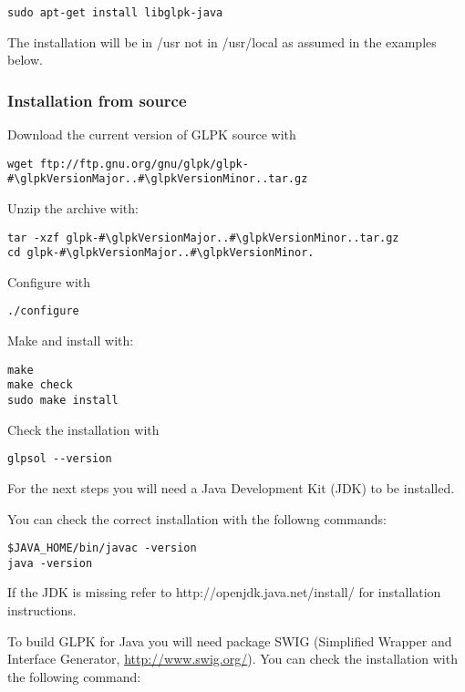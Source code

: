 \documentclass[a4paper,11pt]{report}
\newcommand{\glpkVersionMajor}{4}
\newcommand{\glpkVersionMinor}{55}
\begin{document}
\begin{lstlisting}
sudo apt-get install libglpk-java
\end{lstlisting}

The installation will be in /usr not in /usr/local as assumed in the examples below.

\subsubsection{Installation from source}

Download the current version of GLPK source with

\begin{lstlisting}
wget ftp://ftp.gnu.org/gnu/glpk/glpk-#\glpkVersionMajor..#\glpkVersionMinor..tar.gz
\end{lstlisting}

Unzip the archive with:

\begin{lstlisting}
tar -xzf glpk-#\glpkVersionMajor..#\glpkVersionMinor..tar.gz
cd glpk-#\glpkVersionMajor..#\glpkVersionMinor.
\end{lstlisting}

Configure with

\begin{lstlisting}
./configure
\end{lstlisting}

Make and install with:

\begin{lstlisting}
make
make check
sudo make install
\end{lstlisting}

Check the installation with

\begin{lstlisting}
glpsol --version
\end{lstlisting}

For the next steps you will need a Java Development Kit (JDK) to be installed.

You can check the correct installation with the followng commands:

\begin{lstlisting}
$JAVA_HOME/bin/javac -version
java -version
\end{lstlisting}

If the JDK is missing refer to http://openjdk.java.net/install/ for
installation instructions.

To build GLPK for Java you will need package SWIG (Simplified Wrapper and
Interface Generator, \href{http://www.swig.org/}{http://www.swig.org/}). You
can check the installation with the following command:
\end{document}
